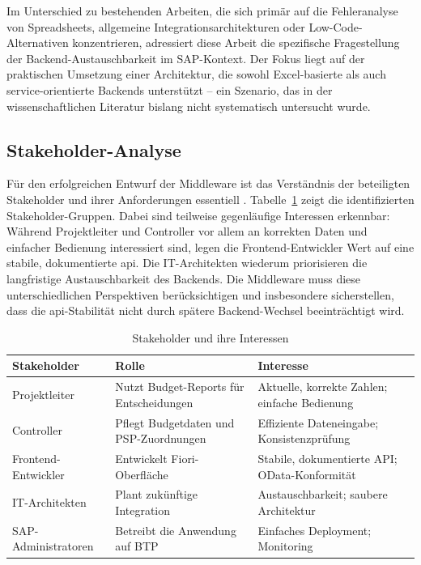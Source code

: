 Im Unterschied zu bestehenden Arbeiten, die sich primär auf die Fehleranalyse von Spreadsheets, allgemeine Integrationsarchitekturen oder Low-Code-Alternativen konzentrieren, adressiert diese Arbeit die spezifische Fragestellung der Backend-Austauschbarkeit im SAP-Kontext. Der Fokus liegt auf der praktischen Umsetzung einer Architektur, die sowohl Excel-basierte als auch service-orientierte Backends unterstützt -- ein Szenario, das in der wissenschaftlichen Literatur bislang nicht systematisch untersucht wurde.

\subsection{Stakeholder-Analyse}

Für den erfolgreichen Entwurf der Middleware ist das Verständnis der beteiligten Stakeholder und ihrer Anforderungen essentiell \citep{sommerville2015}. Tabelle~\ref{tab:stakeholder} zeigt die identifizierten Stakeholder-Gruppen. Dabei sind teilweise gegenläufige Interessen erkennbar: Während Projektleiter und Controller vor allem an korrekten Daten und einfacher Bedienung interessiert sind, legen die Frontend-Entwickler Wert auf eine stabile, dokumentierte \gls{api}. Die IT-Architekten wiederum priorisieren die langfristige Austauschbarkeit des Backends. Die Middleware muss diese unterschiedlichen Perspektiven berücksichtigen und insbesondere sicherstellen, dass die \gls{api}-Stabilität nicht durch spätere Backend-Wechsel beeinträchtigt wird.

\begin{table}[H]
\centering
\caption{Stakeholder und ihre Interessen}
\label{tab:stakeholder}
\begin{tabularx}{\textwidth}{l>{\raggedright\arraybackslash}X>{\raggedright\arraybackslash}X}
\toprule
\textbf{Stakeholder} & \textbf{Rolle} & \textbf{Interesse} \\
\midrule
Projektleiter & Nutzt Budget-Reports für Entscheidungen & Aktuelle, korrekte Zahlen; einfache Bedienung \\
\midrule
Controller & Pflegt Budgetdaten und PSP-Zuordnungen & Effiziente Dateneingabe; Konsistenzprüfung \\
\midrule
Frontend-Entwickler & Entwickelt Fiori-Oberfläche & Stabile, dokumentierte API; OData-Konformität \\
\midrule
IT-Architekten & Plant zukünftige Integration & Austauschbarkeit; saubere Architektur \\
\midrule
SAP-Administratoren & Betreibt die Anwendung auf BTP & Einfaches Deployment; Monitoring \\
\bottomrule
\end{tabularx}
\end{table}

